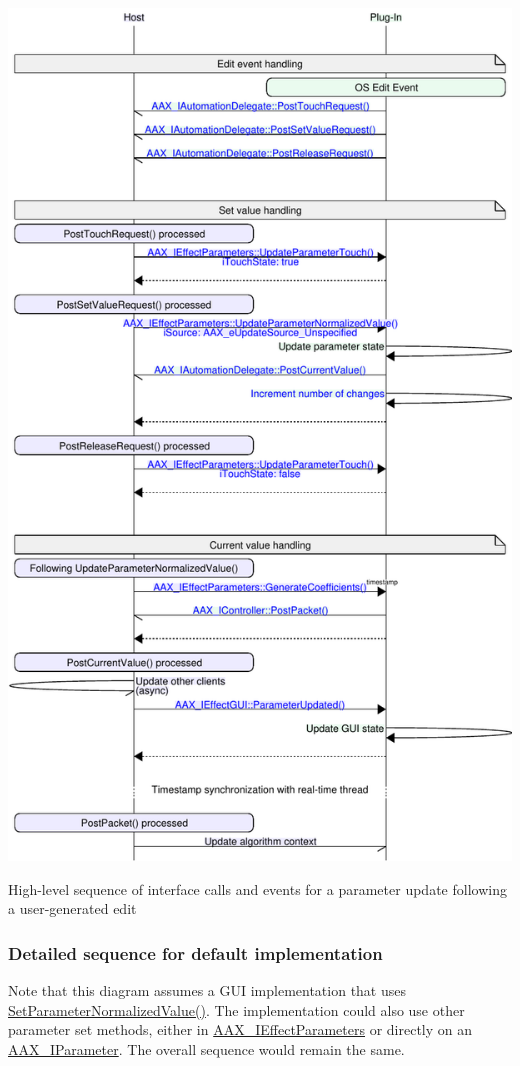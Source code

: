 \begin{DoxyImage}
\includegraphics[width=\textwidth,height=\textheight/2,keepaspectratio=true]{msc_AAX_ParameterUpdate_GUI_HighLevel}
\caption{High-\/level sequence of interface calls and events for a parameter update following a user-\/generated edit}
\end{DoxyImage}
 \hypertarget{a00353_parameterUpdates_sequences_user_details}{}\subsubsection{Detailed sequence for default implementation}\label{a00353_parameterUpdates_sequences_user_details}
Note that this diagram assumes a G\+U\+I implementation that uses \hyperlink{a00061_a368b0f5a761d1eda4c41b420f153a077}{Set\+Parameter\+Normalized\+Value()}. The implementation could also use other parameter set methods, either in \hyperlink{a00099}{A\+A\+X\+\_\+\+I\+Effect\+Parameters} or directly on an \hyperlink{a00108}{A\+A\+X\+\_\+\+I\+Parameter}. The overall sequence would remain the same.


